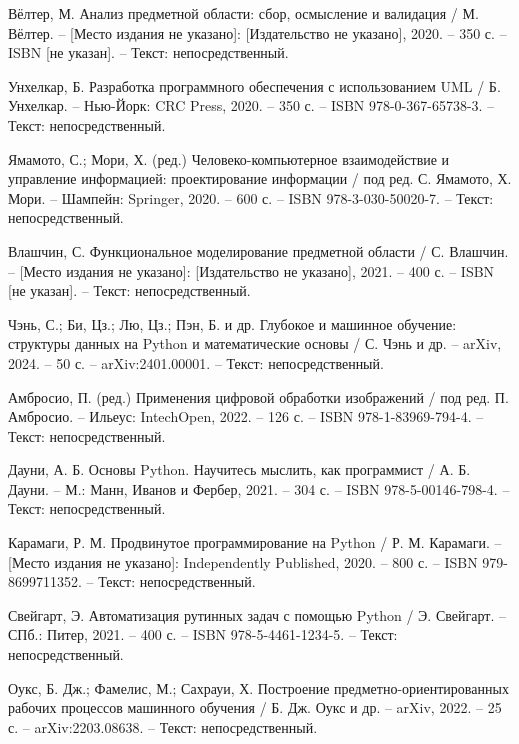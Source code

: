 \begin{thebibliography}{9}
     Вёлтер, М. Анализ предметной области: сбор, осмысление и валидация / М. Вёлтер. – [Место издания не указано]: [Издательство не указано], 2020. – 350 с. – ISBN [не указан]. – Текст: непосредственный.
    
     Унхелкар, Б. Разработка программного обеспечения с использованием UML / Б. Унхелкар. – Нью-Йорк: CRC Press, 2020. – 350 с. – ISBN 978-0-367-65738-3. – Текст: непосредственный.
    
     Ямамото, С.; Мори, Х. (ред.) Человеко-компьютерное взаимодействие и управление информацией: проектирование информации / под ред. С. Ямамото, Х. Мори. – Шампейн: Springer, 2020. – 600 с. – ISBN 978-3-030-50020-7. – Текст: непосредственный.
    
     Влашчин, С. Функциональное моделирование предметной области / С. Влашчин. – [Место издания не указано]: [Издательство не указано], 2021. – 400 с. – ISBN [не указан]. – Текст: непосредственный.
    
     Чэнь, С.; Би, Цз.; Лю, Цз.; Пэн, Б. и др. Глубокое и машинное обучение: структуры данных на Python и математические основы / С. Чэнь и др. – arXiv, 2024. – 50 с. – arXiv:2401.00001. – Текст: непосредственный.
    
     Амбросио, П. (ред.) Применения цифровой обработки изображений / под ред. П. Амбросио. – Ильеус: IntechOpen, 2022. – 126 с. – ISBN 978-1-83969-794-4. – Текст: непосредственный.
    
     Дауни, А. Б. Основы Python. Научитесь мыслить, как программист / А. Б. Дауни. – М.: Манн, Иванов и Фербер, 2021. – 304 с. – ISBN 978-5-00146-798-4. – Текст: непосредственный.
    
     Карамаги, Р. М. Продвинутое программирование на Python / Р. М. Карамаги. – [Место издания не указано]: Independently Published, 2020. – 800 с. – ISBN 979-8699711352. – Текст: непосредственный.
    
     Свейгарт, Э. Автоматизация рутинных задач с помощью Python / Э. Свейгарт. – СПб.: Питер, 2021. – 400 с. – ISBN 978-5-4461-1234-5. – Текст: непосредственный.
    
     Оукс, Б. Дж.; Фамелис, М.; Сахрауи, Х. Построение предметно-ориентированных рабочих процессов машинного обучения / Б. Дж. Оукс и др. – arXiv, 2022. – 25 с. – arXiv:2203.08638. – Текст: непосредственный.
    
    
\end{thebibliography}
